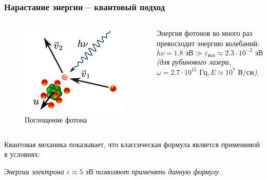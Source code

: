 \documentclass{beamer}
\begin{document}
	\begin{frame}
		\frametitle{Нарастание энергии -- квантовый подход}
		
		\begin{columns}
			\begin{figure}
				\centering
				\includegraphics[width=0.8\linewidth]{res/collision_with_recoil.png}
				\caption*{Поглощение фотона}
			\end{figure}
			
			Энергия фотонов во много раз превосходит энергию колебаний:
			$$  h\nu = 1.8 \text{ эВ} \gg\varepsilon_{\text{кол}} \approx 2.3\cdot 10^{-2} \text{ эВ} $$
			\footnotesize
			\emph{(для рубинового лазера, $\omega = 2.7 \cdot 10^{15} \text{ Гц}, E \approx 10^7 \text{ В/см}$)}.
		\end{columns}
		
		Квантовая механика показывает, что классическая формула является применимой в условиях: 
		\begin{center}
		\end{center}

		\footnotesize
		\emph{Энергии электрона $\varepsilon \approx 5 \text{ эВ}$ позволяют применять данную формулу}.
		
		
		
%		
%		
%		
	\end{frame}
	
\end{document}
